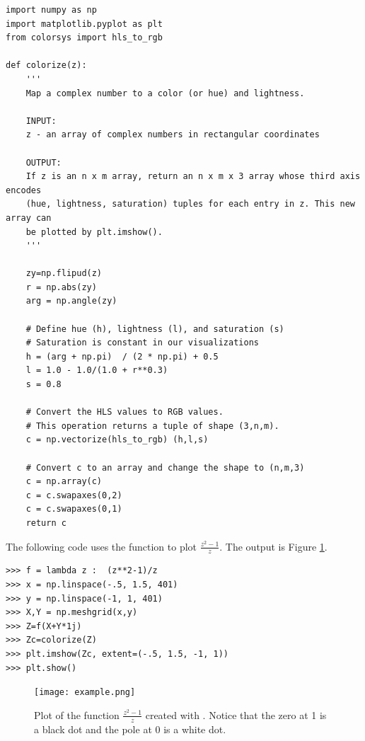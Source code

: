 \begin{lstlisting}
import numpy as np
import matplotlib.pyplot as plt
from colorsys import hls_to_rgb

def colorize(z):
    ''' 
    Map a complex number to a color (or hue) and lightness.
    
    INPUT:
    z - an array of complex numbers in rectangular coordinates
    
    OUTPUT:
    If z is an n x m array, return an n x m x 3 array whose third axis encodes 
    (hue, lightness, saturation) tuples for each entry in z. This new array can 
    be plotted by plt.imshow().
    '''
    
    zy=np.flipud(z)
    r = np.abs(zy)
    arg = np.angle(zy)

    # Define hue (h), lightness (l), and saturation (s)
    # Saturation is constant in our visualizations
    h = (arg + np.pi)  / (2 * np.pi) + 0.5
    l = 1.0 - 1.0/(1.0 + r**0.3)
    s = 0.8

    # Convert the HLS values to RGB values.
    # This operation returns a tuple of shape (3,n,m).
    c = np.vectorize(hls_to_rgb) (h,l,s) 
    
    # Convert c to an array and change the shape to (n,m,3)
    c = np.array(c)  
    c = c.swapaxes(0,2)
    c = c.swapaxes(0,1)
    return c
\end{lstlisting}

The following code uses the  function to plot  $\frac{z^2 - 1}{z}$. The output is Figure \ref{fig:example}.

\begin{lstlisting}
>>> f = lambda z :  (z**2-1)/z
>>> x = np.linspace(-.5, 1.5, 401)
>>> y = np.linspace(-1, 1, 401)
>>> X,Y = np.meshgrid(x,y)
>>> Z=f(X+Y*1j)
>>> Zc=colorize(Z)
>>> plt.imshow(Zc, extent=(-.5, 1.5, -1, 1))
>>> plt.show()
\end{lstlisting}

\begin{figure}
\texttt{[image: example.png]}
\caption{Plot of the function $\frac{z^2 - 1}{z}$ created with .
Notice that the zero at 1 is a black dot and the pole at 0 is a white dot.}
\label{fig:example}
\end{figure}

